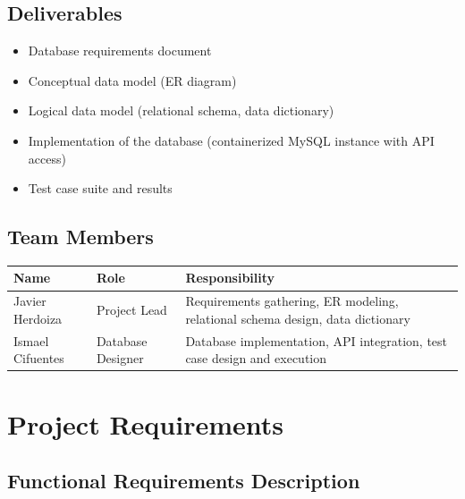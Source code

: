 \documentclass[11pt]{article}
\renewcommand{\_}{\oldunderscore\allowbreak}
\begin{document}
\subsection{Deliverables}
\begin{itemize}[leftmargin=1.4em, itemsep=0.2em]
  \item Database requirements document
  \item Conceptual data model (ER diagram)
  \item Logical data model (relational schema, data dictionary)
  \item Implementation of the database (containerized MySQL instance with API access)
  \item Test case suite and results
\end{itemize}

\subsection{Team Members}

\begin{longtable}{@{}p{3.5cm}p{3.5cm}p{6.5cm}@{}}
\toprule
\textbf{Name} & \textbf{Role} & \textbf{Responsibility} \\
\midrule
\endhead
Javier Herdoiza & Project Lead & Requirements gathering, ER modeling, relational schema design, data dictionary \\[0.6em]
Ismael Cifuentes & Database Designer & Database implementation, API integration, test case design and execution \\[0.6em]
\bottomrule
\end{longtable}

\section{Project Requirements}

\subsection{Functional Requirements Description}
\end{document}
